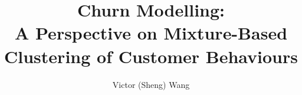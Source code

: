 \title{Churn Modelling: \\A Perspective on Mixture-Based Clustering of Customer Behaviours}
\author{Victor (Sheng) Wang} \maketitle